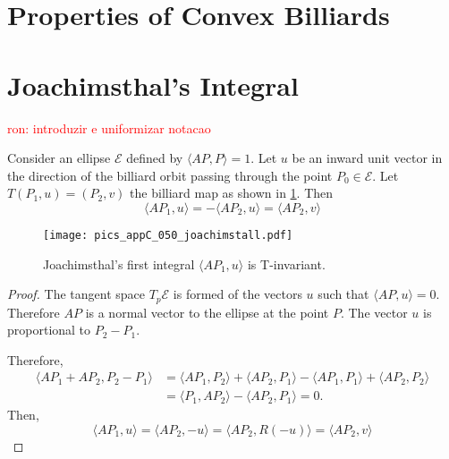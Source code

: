   
\section{Properties of Convex Billiards}
\label{app:appC-convex-billiard}

\section{Joachimsthal's Integral}

\textcolor{red}{ron: introduzir e uniformizar notacao}


\begin{proposition}\label{prop:invariant_joachim} Consider an ellipse $\mathcal{E}$ defined by $\langle A P,P\rangle=1$. Let $u$ be an inward unit vector in the direction of the billiard orbit passing through the point $P_0\in\mathcal{E} $. Let $T(P_1,u)=(P_2,v)$ the billiard map as shown in   \cref{fig:appC-joachim}.
	Then 
	\[  \langle A P_1,u\rangle =  -\langle A P_2,u\rangle=  \langle A P_2,v\rangle  \]
\label{prop:appA-joachim}
	\end{proposition}

\begin{figure}[H]
	\begin{center}
	 \texttt{[image: pics\_appC\_050\_joachimstall.pdf]}
		\caption {Joachimsthal's first integral  $\langle AP_1,u\rangle $ is T-invariant.}
		 \label{fig:appC-joachim}
	\end{center}
\end{figure}

\begin{proof} The tangent space  $T_{p}\mathcal{E}$ is formed of the vectors $u$ such that $ \langle A P,u\rangle =0.$ Therefore $AP$ is a normal vector to the ellipse at the point $P$. The vector $u$ is proportional to $P_2-P_1$.
	
	Therefore,
	\begin{align*}  \langle AP_1+AP_2 , P_2-P_1\rangle &= \langle AP_1  , P_2 \rangle + \langle AP_2  , P_1 \rangle  - \langle AP_1  , P_1 \rangle + \langle AP_2  , P_2 \rangle \\
	&= \langle  P_1  , AP_2 \rangle - \langle AP_2  , P_1 \rangle =0. 
	\end{align*}
	Then,
	\[ \langle AP_1 , u\rangle =\langle  AP_2 ,-u\rangle  =  \langle  AP_2 ,R(-u)\rangle  =  \langle  AP_2, v\rangle \]
	\end{proof}
	
